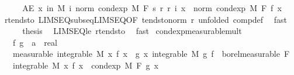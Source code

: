 \begin{isabellebody}
\ \ \isamarkupfalse%
\ \isamarkupfalse%
\ {\isachardoublequoteopen}AE\ x\ in\ M{\isachardot}{\kern0pt}\ {\isacharparenleft}{\kern0pt}{\isasymlambda}i{\isachardot}{\kern0pt}\ norm\ {\isacharparenleft}{\kern0pt}cond{\isacharunderscore}{\kern0pt}exp\ M\ F\ {\isacharparenleft}{\kern0pt}s\ {\isacharparenleft}{\kern0pt}r\ {\isacharparenleft}{\kern0pt}r{\isacharprime}{\kern0pt}\ i{\isacharparenright}{\kern0pt}{\isacharparenright}{\kern0pt}{\isacharparenright}{\kern0pt}\ x{\isacharparenright}{\kern0pt}{\isacharparenright}{\kern0pt}\ {\isasymlonglonglongrightarrow}\ norm\ {\isacharparenleft}{\kern0pt}cond{\isacharunderscore}{\kern0pt}exp\ M\ F\ f\ x{\isacharparenright}{\kern0pt}{\isachardoublequoteclose}\ \isamarkupfalse%
\ r{\isacharunderscore}{\kern0pt}tendsto\ LIMSEQ{\isacharunderscore}{\kern0pt}subseq{\isacharunderscore}{\kern0pt}LIMSEQ{\isacharbrackleft}{\kern0pt}OF\ tendsto{\isacharunderscore}{\kern0pt}norm\ r{\isacharprime}{\kern0pt}{\isacharcomma}{\kern0pt}\ unfolded\ comp{\isacharunderscore}{\kern0pt}def{\isacharbrackright}{\kern0pt}\ \isamarkupfalse%
\ fast\isanewline
\ \ \isamarkupfalse%
\ \isamarkupfalse%
\ {\isacharquery}{\kern0pt}thesis\ \isamarkupfalse%
\ LIMSEQ{\isacharunderscore}{\kern0pt}le\ r{\isacharprime}{\kern0pt}{\isacharunderscore}{\kern0pt}tendsto\ \isamarkupfalse%
\ fast\isanewline
{}\isamarkupfalse%
%
\endisatagproof
{\isafoldproof}%
%
\isadelimproof
\isanewline
%
\endisadelimproof
\isanewline
\isanewline
\isanewline
{}\isamarkupfalse%
\ cond{\isacharunderscore}{\kern0pt}exp{\isacharunderscore}{\kern0pt}measurable{\isacharunderscore}{\kern0pt}mult{\isacharcolon}{\kern0pt}\isanewline
\ \ \ f\ g\ {\isacharcolon}{\kern0pt}{\isacharcolon}{\kern0pt}\ {\isachardoublequoteopen}{\isacharprime}{\kern0pt}a\ {\isasymRightarrow}\ real{\isachardoublequoteclose}\isanewline
\ \ \ {\isacharbrackleft}{\kern0pt}measurable{\isacharbrackright}{\kern0pt}{\isacharcolon}{\kern0pt}\ {\isachardoublequoteopen}integrable\ M\ {\isacharparenleft}{\kern0pt}{\isasymlambda}x{\isachardot}{\kern0pt}\ f\ x\ {\isacharasterisk}{\kern0pt}\ g\ x{\isacharparenright}{\kern0pt}{\isachardoublequoteclose}\ {\isachardoublequoteopen}integrable\ M\ g{\isachardoublequoteclose}\ {\isachardoublequoteopen}f\ {\isasymin}\ borel{\isacharunderscore}{\kern0pt}measurable\ F{\isachardoublequoteclose}\ \isanewline
\ \ \ {\isachardoublequoteopen}integrable\ M\ {\isacharparenleft}{\kern0pt}{\isasymlambda}x{\isachardot}{\kern0pt}\ f\ x\ {\isacharasterisk}{\kern0pt}\ cond{\isacharunderscore}{\kern0pt}exp\ M\ F\ g\ x{\isacharparenright}{\kern0pt}{\isachardoublequoteclose}\isanewline

\end{isabellebody}
